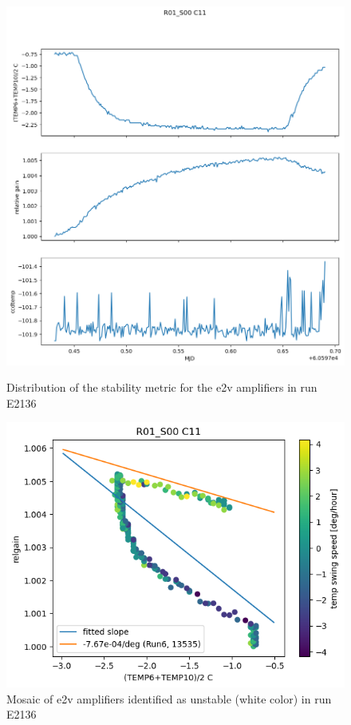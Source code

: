 \begin{figure}[htbp]
\centering
\begin{minipage}{0.45\textwidth}
    \centering
    \includegraphics[width=\textwidth]{figures/RelgainParametersTrending.png}
    \caption{Distribution of the stability metric for the e2v amplifiers in run E2136}
\end{minipage}
\hfill
\begin{minipage}{0.45\textwidth}
    \centering
    \includegraphics[width=\textwidth]{figures/RelgainDetail.png}
    \caption{Mosaic of e2v amplifiers identified as unstable (white color) in run E2136}
\end{minipage}
\end{figure}



